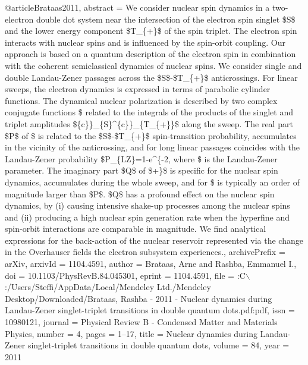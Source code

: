 @article{Brataas2011,
abstract = {We consider nuclear spin dynamics in a two-electron double dot system near the intersection of the electron spin singlet {\$}S{\$} and the lower energy component {\$}T{\_}{\{}+{\}}{\$} of the spin triplet. The electron spin interacts with nuclear spins and is influenced by the spin-orbit coupling. Our approach is based on a quantum description of the electron spin in combination with the coherent semiclassical dynamics of nuclear spins. We consider single and double Landau-Zener passages across the {\$}S{\$}-{\$}T{\_}{\{}+{\}}{\$} anticrossings. For linear sweeps, the electron dynamics is expressed in terms of parabolic cylinder functions. The dynamical nuclear polarization is described by two complex conjugate functions {\$}\backslashLambda {\^{}}{\{}\backslashpm{\}}{\$} related to the integrals of the products of the singlet and triplet amplitudes {\$}{\{}\backslashtilde{\{}c{\}}{\}}{\_}{\{}S{\}}{\^{}}{\{}\backslashast{\}}{\{}\backslashtilde{\{}c{\}}{\}}{\_}{\{}T{\_}{\{}+{\}}{\}}{\$} along the sweep. The real part {\$}P{\$} of {\$}\backslashLambda {\^{}}{\{}\backslashpm{\}}{\$} is related to the {\$}S{\$}-{\$}T{\_}{\{}+{\}}{\$} spin-transition probability, accumulates in the vicinity of the anticrossing, and for long linear passages coincides with the Landau-Zener probability {\$}P{\_}{\{}LZ{\}}=1-e{\^{}}{\{}-2\backslashpi \backslashgamma{\}}{\$}, where {\$}\backslashgamma {\$} is the Landau-Zener parameter. The imaginary part {\$}Q{\$} of {\$}\backslashLambda{\^{}}{\{}+{\}}{\$} is specific for the nuclear spin dynamics, accumulates during the whole sweep, and for {\$}\backslashgamma {} is typically an order of magnitude larger than {\$}P{\$}. {\$}Q{\$} has a profound effect on the nuclear spin dynamics, by (i) causing intensive shake-up processes among the nuclear spins and (ii) producing a high nuclear spin generation rate when the hyperfine and spin-orbit interactions are comparable in magnitude. We find analytical expressions for the back-action of the nuclear reservoir represented via the change in the Overhauser fields the electron subsystem experiences.},
archivePrefix = {arXiv},
arxivId = {1104.4591},
author = {Brataas, Arne and Rashba, Emmanuel I.},
doi = {10.1103/PhysRevB.84.045301},
eprint = {1104.4591},
file = {:C$\backslash$:/Users/Steffi/AppData/Local/Mendeley Ltd./Mendeley Desktop/Downloaded/Brataas, Rashba - 2011 - Nuclear dynamics during Landau-Zener singlet-triplet transitions in double quantum dots.pdf:pdf},
issn = {10980121},
journal = {Physical Review B - Condensed Matter and Materials Physics},
number = {4},
pages = {1--17},
title = {{Nuclear dynamics during Landau-Zener singlet-triplet transitions in double quantum dots}},
volume = {84},
year = {2011}
}
